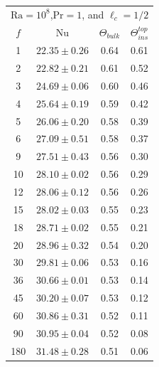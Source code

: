 \documentclass{jfm}
\begin{document}
\begin{center}
\begin{tabular}{cccc}
\toprule
\multicolumn{4}{c}{$\text{Ra}=10^8$,$\text{Pr}=1$, and $\ell_c=1/2$} \\
	$f$ & $\text{Nu}$ & $\Theta_{bulk}$ & $\Theta^{top}_{ins}$ \\
\midrule
	1 & $22.35\pm0.26$ & 0.64 & 0.61 \\
	2 & $22.82\pm0.21$ & 0.61 & 0.52 \\
	3 & $24.69\pm0.06$ & 0.60 & 0.46 \\
	4 & $25.64\pm0.19$ & 0.59 & 0.42 \\
	5 & $26.06\pm0.20$ & 0.58 & 0.39 \\
	6 & $27.09\pm0.51$ & 0.58 & 0.37 \\
	9 & $27.51\pm0.43$ & 0.56 & 0.30 \\
	10 & $28.10\pm0.02$ & 0.56 & 0.29 \\
	12 & $28.06\pm0.12$ & 0.56 & 0.26 \\
	15 & $28.02\pm0.03$ & 0.55 & 0.23 \\
	18 & $28.71\pm0.02$ & 0.55 & 0.21 \\
	20 & $28.96\pm0.32$ & 0.54 & 0.20 \\
	30 & $29.81\pm0.06$ & 0.53 & 0.16 \\
	36 & $30.66\pm0.01$ & 0.53 & 0.14 \\
	45 & $30.20\pm0.07$ & 0.53 & 0.12 \\
	60 & $30.86\pm0.31$ & 0.52 & 0.11 \\
	90 & $30.95\pm0.04$ & 0.52 & 0.08 \\
	180 & $31.48\pm0.28$ & 0.51 & 0.06 \\ 
\bottomrule
\end{tabular}
\end{center}
\end{document}
